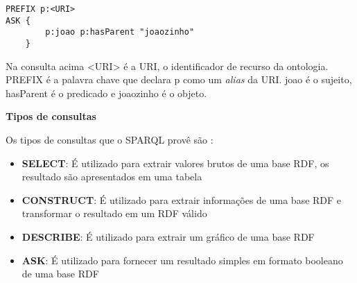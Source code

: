 \lstset{language=SQL,basicstyle=\ttfamily,breaklines=true}
\begin{lstlisting}
PREFIX p:<URI>
ASK {
        p:joao p:hasParent "joaozinho" 
    }
\end{lstlisting} 

\vskip 0.6cm

Na consulta acima <URI> é a URI, o identificador de recurso da ontologia. 
PREFIX é a palavra chave  que declara p como um \textit{alias} da URI. joao é o
sujeito, hasParent é o predicado e joaozinho é o objeto.

\textbf{Tipos de consultas}

Os tipos de consultas que o SPARQL provê são \cite{beckett2006sparql}:

\begin{itemize}

    \item \textbf{SELECT}: É utilizado para extrair valores brutos de uma base
    RDF, os resultado são apresentados em uma tabela
    
    \item \textbf{CONSTRUCT}: É utilizado para extrair informações de uma base 
    RDF e transformar o resultado em um RDF válido
    
    \item \textbf{DESCRIBE}: É utilizado para extrair um gráfico de uma base 
    RDF
    
    \item \textbf{ASK}: É utilizado para fornecer um resultado simples em formato
    booleano de uma base RDF

\end{itemize}